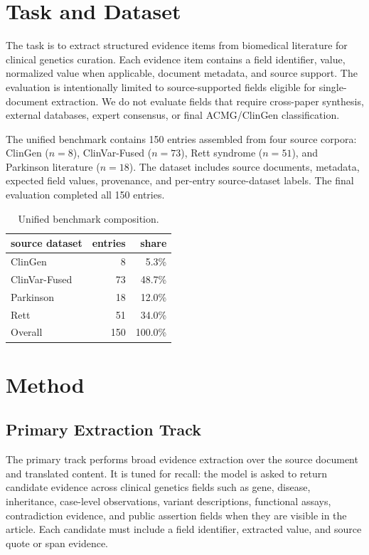 \documentclass[conference]{IEEEtran}
\begin{document}
\section{Task and Dataset}
The task is to extract structured evidence items from biomedical literature for clinical genetics curation. Each evidence item contains a field identifier, value, normalized value when applicable, document metadata, and source support. The evaluation is intentionally limited to source-supported fields eligible for single-document extraction. We do not evaluate fields that require cross-paper synthesis, external databases, expert consensus, or final ACMG/ClinGen classification.

The unified benchmark contains 150 entries assembled from four source corpora: ClinGen ($n=8$), ClinVar-Fused ($n=73$), Rett syndrome ($n=51$), and Parkinson literature ($n=18$). The dataset includes source documents, metadata, expected field values, provenance, and per-entry source-dataset labels. The final evaluation completed all 150 entries.

\begin{table}[t]
\centering
\caption{Unified benchmark composition.}
\label{tab:dataset}
\setlength{\tabcolsep}{5pt}
\renewcommand{\arraystretch}{1.08}
\small
\begin{tabular}{lrr}
\toprule
source dataset & entries & share \\
\midrule
ClinGen & 8 & 5.3\% \\
ClinVar-Fused & 73 & 48.7\% \\
Parkinson & 18 & 12.0\% \\
Rett & 51 & 34.0\% \\
\midrule
Overall & 150 & 100.0\% \\
\bottomrule
\end{tabular}
\end{table}

\section{Method}
\subsection{Primary Extraction Track}
The primary track performs broad evidence extraction over the source document and translated content. It is tuned for recall: the model is asked to return candidate evidence across clinical genetics fields such as gene, disease, inheritance, case-level observations, variant descriptions, functional assays, contradiction evidence, and public assertion fields when they are visible in the article. Each candidate must include a field identifier, extracted value, and source quote or span evidence.
\end{document}
